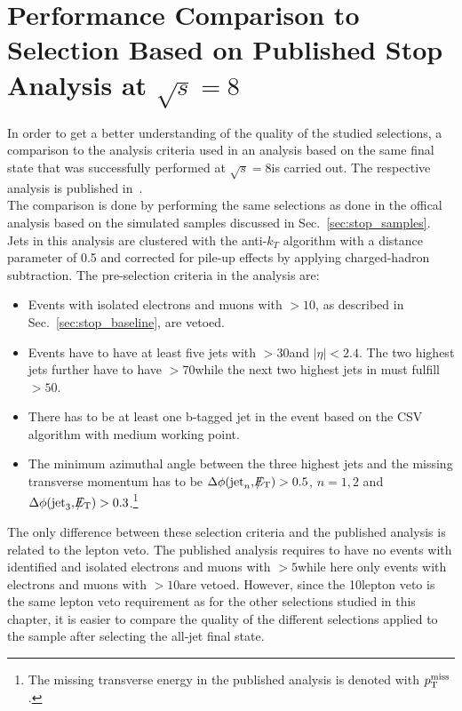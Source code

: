 \section{Performance Comparison to Selection Based on Published Stop Analysis at $\sqrt{s} = 8$\tev}
\label{sec:stop_pub}
In order to get a better understanding of the quality of the studied selections, a comparison to the analysis criteria used in an analysis based on the same final state that was successfully performed at $\sqrt{s} = 8$\tev is carried out. The respective analysis is published in~\cite{CMS-PAS-SUS-13-015}. \\
The comparison is done by performing the same selections as done in the offical analysis based on the simulated samples discussed in Sec.~\ref{sec:stop_samples}. Jets in this analysis are clustered with the anti-$k_T$ algorithm with a distance parameter of 0.5 and corrected for pile-up effects by applying charged-hadron subtraction. The pre-selection criteria in the analysis are:
\begin{itemize}
 \item Events with isolated electrons and muons with \pt$ > 10$\gev, as described in Sec.~\ref{sec:stop_baseline}, are vetoed.
 \item Events have to have at least five jets with \pt$ > 30$\gev and $|\eta| < 2.4$. The two highest \pt jets further have to have \pt$> 70$\gev while the next two highest jets in \pt must fulfill \pt$ > 50$\gev.
 \item There has to be at least one b-tagged jet in the event based on the CSV algorithm with medium working point. 
 \item The minimum azimuthal angle between the three highest jets and the missing transverse momentum has to be $\Delta \phi(\mathrm{jet}_n, \slash\mkern-12mu{E}_{\text{T}}) > 0.5$, $n = 1,2$ and $\Delta \phi(\mathrm{jet}_3, \slash\mkern-12mu{E}_{\text{T}}) > 0.3$.\footnote{The missing transverse energy in the published analysis is denoted with $p_{\text{T}}^\mathrm{miss}$.}%
\end{itemize}
The only difference between these selection criteria and the published analysis is related to the lepton veto. The published analysis requires to have no events with identified and isolated electrons and muons with \pt$> 5$\gev while here only events with electrons and muons with \pt$> 10$\gev are vetoed. However, since the 10\gev lepton veto is the same lepton veto requirement as for the other selections studied in this chapter, it is easier to compare the quality of the different selections applied to the sample after selecting the all-jet final state. \\
